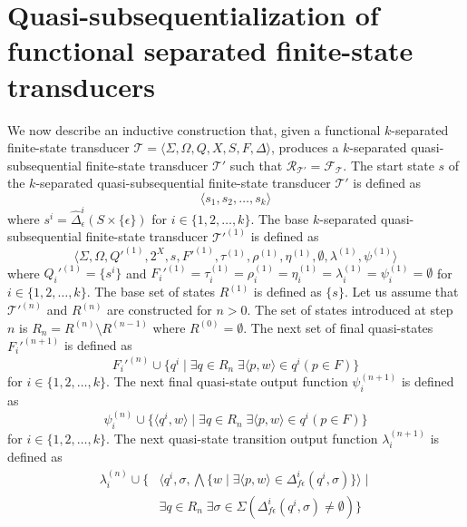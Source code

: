 \section{Quasi-subsequentialization of functional separated finite-state transducers}

We now describe an inductive construction that, given a functional $k$-separated
finite-state transducer $\mathcal{T} = \langle \Sigma, \Omega, Q, X, S, F, \Delta
\rangle$, produces a $k$-separated quasi-subsequential finite-state transducer
$\mathcal{T}'$ such that $\mathcal{R}_{\mathcal{T}'} = \mathcal{F}_\mathcal{T}$.
The start state $s$ of the $k$-separated quasi-subsequential finite-state transducer
$\mathcal{T}'$ is defined as
\begin{equation*}
  \langle s_1, s_2, \ldots, s_k \rangle
\end{equation*}
where $s^i = \hat{\Delta}_\epsilon^i(S \times \{ \epsilon \})$ for $i \in \{ 1, 2,
\ldots, k \}$. The base $k$-separated quasi-subsequential finite-state transducer
$\mathcal{T}'^{(1)}$ is defined as
\begin{equation*}
  \langle \Sigma, \Omega, Q'^{(1)}, 2^X, s, F'^{(1)}, \tau^{(1)}, \rho^{(1)},
  \eta^{(1)}, \emptyset, \lambda^{(1)}, \psi^{(1)} \rangle
\end{equation*}
where $Q_i'^{(1)} = \{ s^i \}$ and $F_i'^{(1)} = \tau_i^{(1)} = \rho_i^{(1)} =
\eta_i^{(1)} = \lambda_i^{(1)} = \psi_i^{(1)} = \emptyset$ for $i \in \{ 1, 2,
\ldots, k \}$.
The base set of states $R^{(1)}$ is defined as $\{ s \}$.
Let us assume that $\mathcal{T}'^{(n)}$ and $R^{(n)}$ are constructed for $n > 0$.
The set of states introduced at step $n$ is $R_n = R^{(n)} \setminus R^{(n-1)}$ where
$R^{(0)} = \emptyset$.
The next set of final quasi-states $F_i'^{(n+1)}$ is defined as
\begin{equation*}
  F_i'^{(n)} \cup \{ q^i \mid \exists q \in R_n \; \exists \langle p, w \rangle \in
  q^i (p \in F) \}
\end{equation*}
for $i \in \{ 1, 2, \ldots, k \}$.
The next final quasi-state output function $\psi_i^{(n+1)}$ is defined as
\begin{equation*}
  \psi_i^{(n)} \cup \{ \langle q^i, w \rangle \mid \exists q \in R_n \; \exists
  \langle p, w \rangle \in q^i (p \in F) \}
\end{equation*}
for $i \in \{ 1, 2, \ldots, k \}$.
The next quasi-state transition output function $\lambda_i^{(n+1)}$ is defined as
\begin{align*}
  \lambda_i^{(n)} \cup \{ &\langle q^i, \sigma,
  \bigwedge \{ w \mid \exists \langle p, w
  \rangle \in \Delta_{f\epsilon}^i(q^i, \sigma) \}
  \rangle \mid\\
  &\exists q \in R_n \; \exists \sigma \in \Sigma
  (\Delta_{f\epsilon}^i(q^i, \sigma) \neq \emptyset) \}
\end{align*}

